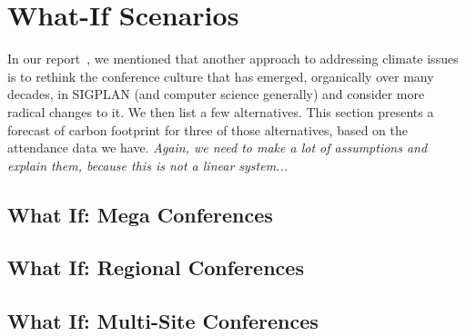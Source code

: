 \section{What-If Scenarios}

In our report~\cite{climate_report}, we mentioned that another approach to addressing climate issues is to rethink the conference culture that has emerged, organically over many decades, in SIGPLAN (and computer science generally) and consider more radical changes to it. We then list a few alternatives. This section presents a forecast of carbon footprint for three of those alternatives, based on the attendance data we have. \emph{Again, we need to make a lot of assumptions and explain them, because this is not a linear system...}

\subsection{What If: Mega Conferences}

\subsection{What If: Regional Conferences}

\subsection{What If: Multi-Site Conferences}